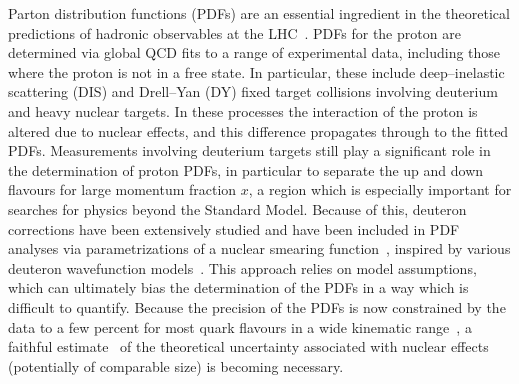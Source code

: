 \documentclass[11pt,a4paper]{article}
\begin{document}
Parton distribution functions (PDFs) are an essential ingredient in the 
theoretical predictions of hadronic observables at the LHC~\cite{Gao_2018,
  Ethier:2020way,Forte:2020yip}. PDFs for the proton are determined via global
QCD fits to a range of experimental data, including those where the proton is
not in a free state. In particular, these include deep--inelastic scattering
(DIS) and Drell--Yan (DY) fixed target collisions involving deuterium and heavy
nuclear  targets. In these processes the interaction of the proton is altered
due to nuclear effects, and this difference propagates through to the fitted
PDFs. Measurements involving deuterium targets still play a significant role
in the determination of proton PDFs, in particular to separate the up and down
flavours for large momentum fraction $x$,  a region which is especially
important for searches for physics beyond the Standard Model. Because of this,
deuteron corrections have been extensively studied and have been included in
PDF analyses via parametrizations of a nuclear smearing
function~\cite{Owens:2012bv,Ball:2013gsa,Harland-Lang:2014zoa,Accardi:2016qay,
  Alekhin:2017fpf}, inspired by various deuteron wavefunction
models~\cite{Wiringa:1994wb,Melnitchouk:1994rv,Melnitchouk:1996vp,
  Machleidt:2000ge,Gross:2014wqa}. This approach relies
on model assumptions, which can ultimately bias the determination of the
PDFs in a way which is difficult to quantify. Because the precision of the PDFs
is now constrained by the data to a few percent for most quark flavours in a
wide kinematic range~\cite{Ball:2017nwa}, a faithful
estimate~\cite{Ball:2018lag} of the theoretical uncertainty associated
with nuclear effects (potentially of comparable size) is becoming
necessary.
\end{document}
